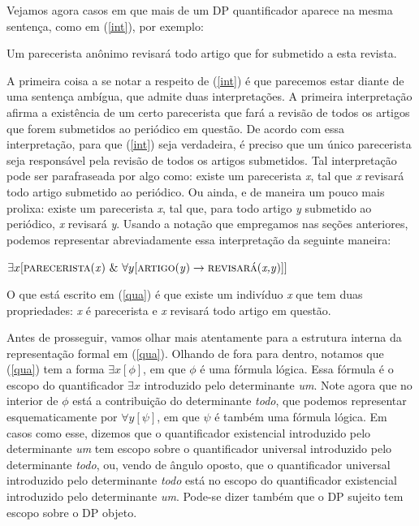 Vejamos agora casos em que mais de um DP
quantificador aparece na mesma sentença, como em
(\ref{int}), por exemplo:

\begin{exe}
    \ex Um parecerista anônimo revisará todo artigo que for submetido a esta revista.\label{int}
\end{exe}

\n A primeira coisa a se notar a respeito de
(\ref{int}) é que parecemos estar diante de uma sentença ambígua, que
admite duas interpretações. A primeira interpretação afirma a existência de um certo parecerista que fará a revisão de todos os artigos que forem submetidos ao periódico em questão. De acordo com essa interpretação, para que (\ref{int}) seja verdadeira, é preciso que um único parecerista seja responsável pela revisão de todos os artigos submetidos. Tal interpretação pode ser parafraseada por algo como: existe um parecerista \textit{x}, tal
que \textit{x} revisará todo artigo submetido ao periódico. Ou ainda, e de maneira um pouco mais prolixa: existe um parecerista \textit{x}, tal que, para todo artigo \textit{y} submetido ao periódico, \textit{x} revisará \textit{y}. Usando a notação que empregamos nas seções anteriores, podemos
representar abreviadamente essa interpretação da seguinte maneira:

\begin{exe}
    \ex $\exists x [\predica{parecerista}{x}\ \&\ 
    \forall y [\predica{artigo}{y} \rightarrow \predica{revisará}{x,y}]]$
     \label{qua}
\end{exe}


\n O que está escrito em (\ref{qua}) é que existe um indivíduo
\textit{x} que tem duas propriedades: \textit{x} é parecerista e \textit{x} revisará todo artigo em questão. 

Antes de prosseguir, vamos olhar mais atentamente para a estrutura
interna da representação formal em (\ref{qua}). Olhando de fora
para dentro, notamos que (\ref{qua}) tem a forma $\exists
x [\phi]$, em que $\phi$ é uma fórmula lógica. Essa fórmula é o
escopo do quantificador $\exists x$ introduzido pelo
determinante  \textit{um}. Note agora que no interior de $\phi$
está a contribuição do determinante \textit{todo}, que podemos representar esquematicamente por $\forall y [\psi]$, em que $\psi$ é também uma fórmula lógica. Em casos como esse, dizemos que o quantificador existencial introduzido pelo determinante \textit{um} tem escopo sobre o
quantificador universal introduzido pelo determinante \textit{todo}, ou, vendo de ângulo oposto, que o quantificador universal introduzido pelo determinante \textit{todo} está no escopo do
quantificador existencial introduzido pelo determinante \textit{um}. Pode-se dizer também que o DP sujeito tem escopo sobre o DP objeto.

